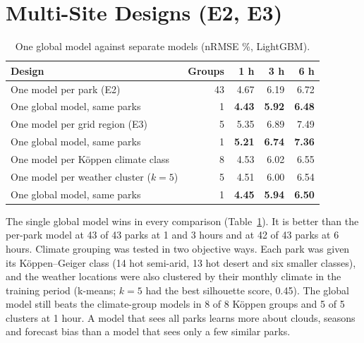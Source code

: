 \documentclass[12pt]{report}
\begin{document}
\section{Multi-Site Designs (E2, E3)}
\vspace{1mm}
\begin{table}[htbp]
\centering
\caption{One global model against separate models (nRMSE \%, LightGBM).}
\label{tab:e23}
\begin{tabular}{lrrrr}
\toprule
Design & Groups & 1 h & 3 h & 6 h \\
\midrule
One model per park (E2) & 43 & 4.67 & 6.19 & 6.72 \\
One global model, same parks & 1 & \textbf{4.43} & \textbf{5.92} & \textbf{6.48} \\
\midrule
One model per grid region (E3) & 5 & 5.35 & 6.89 & 7.49 \\
One global model, same parks & 1 & \textbf{5.21} & \textbf{6.74} & \textbf{7.36} \\
\midrule
One model per Köppen climate class & 8 & 4.53 & 6.02 & 6.55 \\
One model per weather cluster ($k=5$) & 5 & 4.51 & 6.00 & 6.54 \\
One global model, same parks & 1 & \textbf{4.45} & \textbf{5.94} & \textbf{6.50} \\
\bottomrule
\end{tabular}
\end{table}

The single global model wins in every comparison (Table~\ref{tab:e23}). It is better than the per-park model at 43 of 43 parks at 1 and 3 hours and at 42 of 43 parks at 6 hours. Climate grouping was tested in two objective ways. Each park was given its Köppen--Geiger class \cite{rubel2017} (14 hot semi-arid, 13 hot desert and six smaller classes), and the weather locations were also clustered by their monthly climate in the training period (k-means; $k=5$ had the best silhouette score, 0.45). The global model still beats the climate-group models in 8 of 8 Köppen groups and 5 of 5 clusters at 1 hour. A model that sees all parks learns more about clouds, seasons and forecast bias than a model that sees only a few similar parks.
\end{document}
